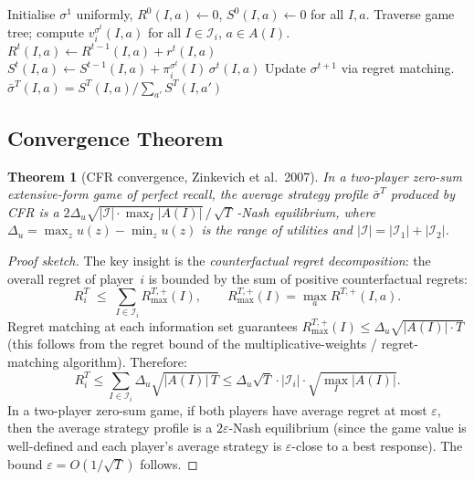 \documentclass[11pt,a4paper]{article}
\theoremstyle{plain}
\newtheorem{theorem}{Theorem}[section]
\theoremstyle{definition}
\newcommand{\cI}{\mathcal{I}}
\begin{document}
\begin{algorithm}[t]
\caption{Vanilla CFR}
\label{alg:cfr}
\begin{algorithmic}[1]
\State Initialise $\sigma^1$ uniformly, $R^0(I,a) \gets 0$,
  $S^0(I,a) \gets 0$ for all $I, a$.
    \State Traverse game tree; compute $v_i^{\sigma^t}(I,a)$ for all
      $I \in \cI_i$, $a \in A(I)$.
    \State $R^t(I,a) \gets R^{t-1}(I,a) + r^t(I,a)$
    \State $S^t(I,a) \gets S^{t-1}(I,a) + \pi_i^{\sigma^t}(I)\,\sigma^t(I,a)$
  \EndFor
  \State Update $\sigma^{t+1}$ via regret matching.
\EndFor
\State \Return $\bar{\sigma}^T(I,a) = S^T(I,a) / \sum_{a'} S^T(I,a')$
\end{algorithmic}
\end{algorithm}

\subsection{Convergence Theorem}

\begin{theorem}[CFR convergence, Zinkevich et al.\ 2007]\label{thm:cfr}
In a two-player zero-sum extensive-form game of perfect recall, the
average strategy profile $\bar{\sigma}^T$ produced by CFR is a
$2\Delta_u \sqrt{|\cI| \cdot \max_I|A(I)|}\,/\,\sqrt{T}$\,-Nash
equilibrium, where $\Delta_u = \max_z u(z) - \min_z u(z)$ is the range
of utilities and $|\cI| = |\cI_1| + |\cI_2|$.
\end{theorem}

\begin{proof}[Proof sketch]
The key insight is the \emph{counterfactual regret decomposition}: the
overall regret of player~$i$ is bounded by the sum of positive
counterfactual regrets:
\[
  R_i^T \;\leq\; \sum_{I \in \cI_i} R^{T,+}_{\max}(I),
  \qquad
  R^{T,+}_{\max}(I) = \max_{a} R^{T,+}(I,a).
\]
Regret matching at each information set guarantees
$R^{T,+}_{\max}(I) \leq \Delta_u \sqrt{|A(I)| \cdot T}$ (this follows
from the regret bound of the multiplicative-weights / regret-matching
algorithm).  Therefore:
\[
  R_i^T
  \leq \sum_{I \in \cI_i} \Delta_u \sqrt{|A(I)|\, T}
  \leq \Delta_u \sqrt{T} \cdot |\cI_i| \cdot \sqrt{\max_I |A(I)|}.
\]
In a two-player zero-sum game, if both players have average regret at
most $\varepsilon$, then the average strategy profile is a
$2\varepsilon$-Nash equilibrium (since the game value is well-defined and
each player's average strategy is $\varepsilon$-close to a best
response).  The bound $\varepsilon = O(1/\sqrt{T})$ follows.
\end{proof}
\end{document}

